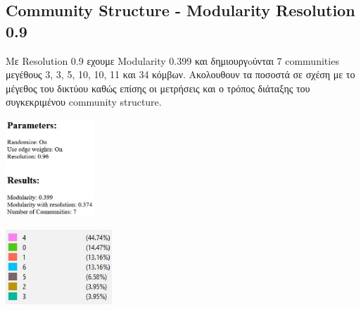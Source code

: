 \documentclass[12pt]{article}
\begin{document}
	
	
	
	
	
	
	
	
	
	
	
	
	
	
	
	
	
	
	
	
	
	\newpage
	\subsection{Community Structure - Modularity Resolution 0.9}
	Με Resolution 0.9 εχουμε Modularity 0.399 και δημιουργoύνται 7 communities μεγέθους 3, 3, 5, 10, 10, 11 και 34 κόμβων. Ακολουθουν τα ποσοστά σε σχέση με το μέγεθος του δικτύου καθώς επίσης οι μετρήσεις και ο τρόπος διάταξης του συγκεκριμένου community structure.
	
	\vspace{12pt}
	\vspace{12pt}
	\begin{center}
		\begin{adjustbox}{valign=t}
			\includegraphics[width=0.25\textwidth]{photos-files/section12/0.96/report.JPG}
		\end{adjustbox}
		\hfill
		\begin{adjustbox}{valign=t}
			\includegraphics[width=0.3\textwidth]{photos-files/section12/0.96/pososta.JPG}
		\end{adjustbox}
	\end{center}
	
\end{document}
